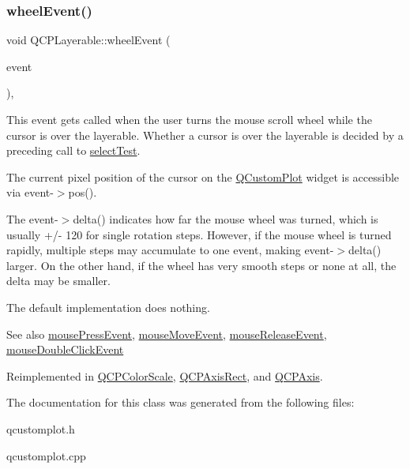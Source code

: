 \subsubsection{\texorpdfstring{wheel\+Event()}{wheelEvent()}}
{\footnotesize\ttfamily void Q\+C\+P\+Layerable\+::wheel\+Event (\begin{DoxyParamCaption}\item[{Q\+Wheel\+Event $\ast$}]{event }\end{DoxyParamCaption})\hspace{0.3cm}{\ttfamily [protected]}, {\ttfamily [virtual]}}

This event gets called when the user turns the mouse scroll wheel while the cursor is over the layerable. Whether a cursor is over the layerable is decided by a preceding call to \hyperlink{classQCPLayerable_a04db8351fefd44cfdb77958e75c6288e}{select\+Test}.

The current pixel position of the cursor on the \hyperlink{classQCustomPlot}{Q\+Custom\+Plot} widget is accessible via {\ttfamily event-\/$>$pos()}.

The {\ttfamily event-\/$>$delta()} indicates how far the mouse wheel was turned, which is usually +/-\/ 120 for single rotation steps. However, if the mouse wheel is turned rapidly, multiple steps may accumulate to one event, making {\ttfamily event-\/$>$delta()} larger. On the other hand, if the wheel has very smooth steps or none at all, the delta may be smaller.

The default implementation does nothing.

\begin{DoxySeeAlso}{See also}
\hyperlink{classQCPLayerable_af6567604818db90f4fd52822f8bc8376}{mouse\+Press\+Event}, \hyperlink{classQCPLayerable_a9eee1ba47fd69be111059ca3881933e4}{mouse\+Move\+Event}, \hyperlink{classQCPLayerable_aa0d79b005686f668622bbe66ac03ba2c}{mouse\+Release\+Event}, \hyperlink{classQCPLayerable_a4171e2e823aca242dd0279f00ed2de81}{mouse\+Double\+Click\+Event} 
\end{DoxySeeAlso}


Reimplemented in \hyperlink{classQCPColorScale_a63cf19be184f6670c9495ad3a9a1baeb}{Q\+C\+P\+Color\+Scale}, \hyperlink{classQCPAxisRect_a93eeaa0c127d6d6fe8171b2455080262}{Q\+C\+P\+Axis\+Rect}, and \hyperlink{classQCPAxis_aa850f195d7cc470c53809d0fff5e444d}{Q\+C\+P\+Axis}.



The documentation for this class was generated from the following files\+:\begin{DoxyCompactItemize}
\item 
qcustomplot.\+h\item 
qcustomplot.\+cpp\end{DoxyCompactItemize}
